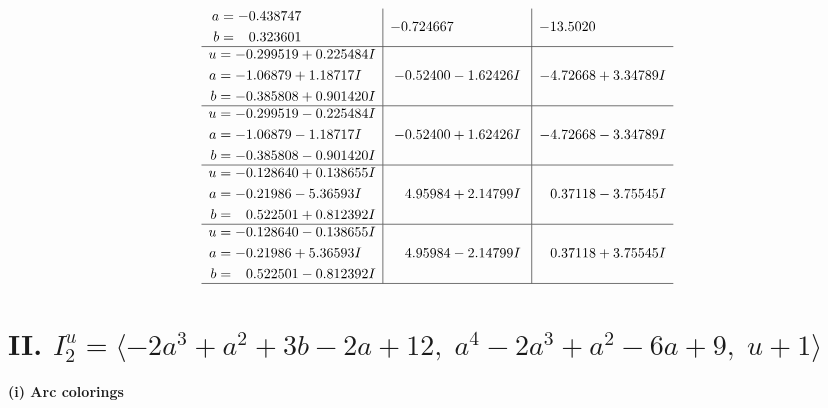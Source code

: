 \documentclass[1p]{elsarticle_modified}
\theoremstyle{definition}
\begin{document}
$$\begin{array}{c|c|c}
\begin{aligned}
a &= -0.438747\phantom{ +0.000000I} \\
b &= \phantom{-}0.323601\phantom{ +0.000000I}\end{aligned}
 & -0.724667\phantom{ +0.000000I} & -13.5020\phantom{ +0.000000I} \\ \hline\begin{aligned}
u &= -0.299519 + 0.225484 I \\
a &= -1.06879 + 1.18717 I \\
b &= -0.385808 + 0.901420 I\end{aligned}
 & -0.52400 - 1.62426 I & -4.72668 + 3.34789 I \\ \hline\begin{aligned}
u &= -0.299519 - 0.225484 I \\
a &= -1.06879 - 1.18717 I \\
b &= -0.385808 - 0.901420 I\end{aligned}
 & -0.52400 + 1.62426 I & -4.72668 - 3.34789 I \\ \hline\begin{aligned}
u &= -0.128640 + 0.138655 I \\
a &= -0.21986 - 5.36593 I \\
b &= \phantom{-}0.522501 + 0.812392 I\end{aligned}
 & \phantom{-}4.95984 + 2.14799 I & \phantom{-}0.37118 - 3.75545 I \\ \hline\begin{aligned}
u &= -0.128640 - 0.138655 I \\
a &= -0.21986 + 5.36593 I \\
b &= \phantom{-}0.522501 - 0.812392 I\end{aligned}
 & \phantom{-}4.95984 - 2.14799 I & \phantom{-}0.37118 + 3.75545 I\\
 \hline 
 \end{array}$$\newpage\newpage\renewcommand{\arraystretch}{1}
\centering \section*{II. $I^u_{2}= \langle -2 a^3+a^2+3 b-2 a+12,\;a^4-2 a^3+a^2-6 a+9,\;u+1 \rangle$}
\flushleft \textbf{(i) Arc colorings}\\
\end{document}
